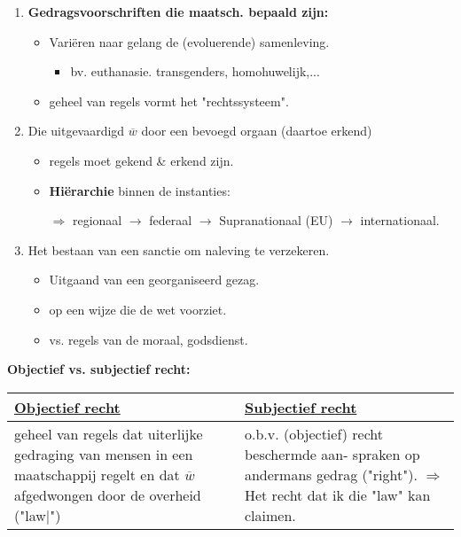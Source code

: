 \begin{enumerate}
	\item \textbf{Gedragsvoorschriften die maatsch. bepaald zijn:}
	\begin{itemize}
		\item Vari\"eren naar gelang de (evoluerende) samenleving.
		\begin{itemize}
			\item bv. euthanasie. transgenders, homohuwelijk,...
		\end{itemize}
		\item geheel van regels vormt het "rechtssysteem".
	\end{itemize}
	\item Die uitgevaardigd $\overline{w}$ door een bevoegd orgaan (daartoe erkend)
	\begin{itemize}
		\item regels moet gekend \& erkend zijn.
		\item \textbf{Hi\"erarchie} binnen de instanties:
		\item[$\Rightarrow$] regionaal $\rightarrow$ federaal  $\rightarrow$ Supranationaal (EU)  $\rightarrow$ internationaal.
		\end{itemize}
	\item Het bestaan van een sanctie om naleving te verzekeren.
	\begin{itemize}
		\item Uitgaand van een georganiseerd gezag.
		\item op een wijze die de wet voorziet.
		\item vs. regels van de moraal, godsdienst.
	\end{itemize}
\end{enumerate}

\textbf{Objectief vs. subjectief recht:}

\begin{tabular}{|p{} | p{} |}
	\hline \textbf{\underline{Objectief recht}} & \textbf{\underline{Subjectief recht}} \\
	\hline geheel van regels dat uiterlijke gedraging van mensen in een maatschappij regelt en dat $\overline{w}$ afgedwongen door de overheid ("law|") & o.b.v. (objectief) recht beschermde aan- spraken op andermans gedrag ("right"). $\Rightarrow$ Het recht dat ik die "law" kan claimen.\\ \hline
\end{tabular}

